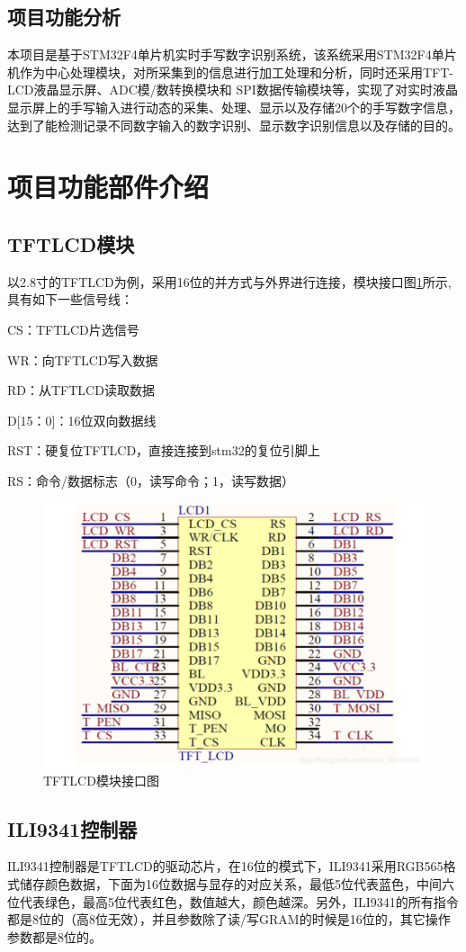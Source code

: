 \documentclass[UTF8]{ctexart}
\begin{document}
\subsection{项目功能分析}
本项目是基于STM32F4单片机实时手写数字识别系统，该系统采用STM32F4单片机作为中心处理模块，对所采集到的信息进行加工处理和分析，同时还采用TFT-LCD液晶显示屏、ADC模/数转换模块和 SPI数据传输模块等，实现了对实时液晶显示屏上的手写输入进行动态的采集、处理、显示以及存储20个的手写数字信息，达到了能检测记录不同数字输入的数字识别、显示数字识别信息以及存储的目的。
\section{项目功能部件介绍}
\subsection{TFTLCD模块}
以2.8寸的TFTLCD为例，采用16位的并方式与外界进行连接，模块接口图\ref{e}所示,具有如下一些信号线：

CS：TFTLCD片选信号

WR：向TFTLCD写入数据

RD：从TFTLCD读取数据

D[15：0]：16位双向数据线

RST：硬复位TFTLCD，直接连接到stm32的复位引脚上

RS：命令/数据标志（0，读写命令；1，读写数据）
\begin{figure}[h]
	\centering
	\includegraphics[scale = 0.6]{6}
	\caption{TFTLCD模块接口图}
	\label{e}
\end{figure}
\subsection{ILI9341控制器}
ILI9341控制器是TFTLCD的驱动芯片，在16位的模式下，ILI9341采用RGB565格式储存颜色数据，下面为16位数据与显存的对应关系，最低5位代表蓝色，中间六位代表绿色，最高5位代表红色，数值越大，颜色越深。另外，ILI9341的所有指令都是8位的（高8位无效），并且参数除了读/写GRAM的时候是16位的，其它操作参数都是8位的。
\end{document}
